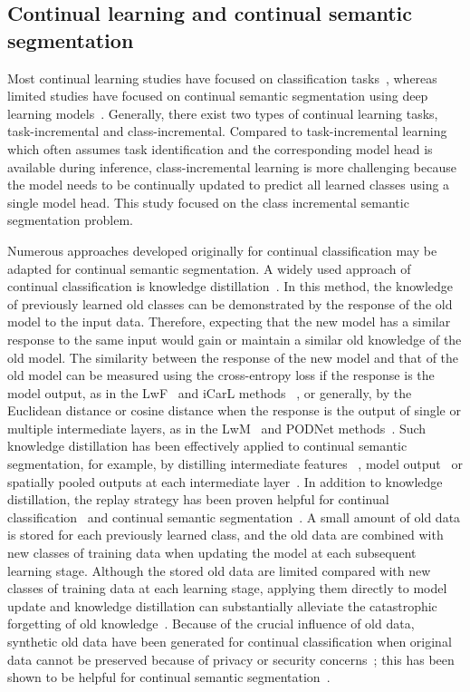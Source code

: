 \documentclass[onecolumn,conference,compsoc]{IEEEtran}
\begin{document}
\begin{spacing}{1.5}
\subsection{Continual learning and continual semantic segmentation}

Most continual learning studies {have focused} on classification tasks~\cite{iCaRL,LwF,UCIR,LwM,End2End-IL}, whereas {limited studies have focused on continual semantic segmentation} using deep learning models~\cite{ILT,MiB,PLOP,SDR,SSUL}. {Generally,} there exist two types of continual learning tasks, task-incremental and class-incremental.
Compared to task-incremental learning which often assumes task identification and the corresponding model head is available during inference, class-incremental learning is more challenging because the model needs to be continually updated to predict all learned classes using a single model head.
This study {focused} on the class incremental semantic segmentation problem.

{Numerous approaches} 
developed originally for continual classification may be adapted for continual semantic segmentation.
A widely used {approach of} continual classification is knowledge distillation~\cite{iCaRL,LwF,End2End-IL,LL-PRDR}. {In this method, the} knowledge of previously learned old classes can be demonstrated by the response of the old model to the input data. {Therefore,} expecting that the new model {has} a similar response to the same input would gain or {maintain a} similar old knowledge of the old model. The similarity between the response of the new model and that of the old model can be measured {using the} cross-entropy loss if the response is the model output, as in the LwF~\cite{LwF} and iCarL methods ~\cite{iCaRL}, or generally, by the Euclidean distance or cosine distance when the response is the output of single or multiple intermediate layers, as in the LwM~\cite{LwM} and PODNet methods~\cite{PODNet}. Such knowledge distillation has been effectively applied to continual semantic segmentation, {for example,} by distilling intermediate {features} ~\cite{ILT}, model output~\cite{MiB} or spatially pooled outputs at each intermediate layer~\cite{PLOP,PLOPLong}. {In addition to} knowledge distillation, the replay strategy has {been} proven helpful for continual classification~\cite{iCaRL, IL2M, MCS_rehearsal_continual} and continual semantic segmentation~\cite{SSUL}. A small amount of old data {is stored} for each previously learned class, and the old data {are} combined {with} new classes of training data when updating the model at each subsequent learning stage. Although the stored old data are limited compared with new classes of training data at each learning stage, applying them directly to model update and knowledge distillation can substantially alleviate the catastrophic forgetting of old knowledge~\cite{ES-CIL,AAN-CIL,PEKCL-TRANS}. {Because of} the crucial influence of old data, synthetic old data {have been generated} for continual classification when original data cannot be preserved {because of} privacy or security concerns~\cite{DFCIL}; {this} has been shown {to be} helpful for continual semantic segmentation~\cite{RECALL}.


\end{spacing}
\end{document}
